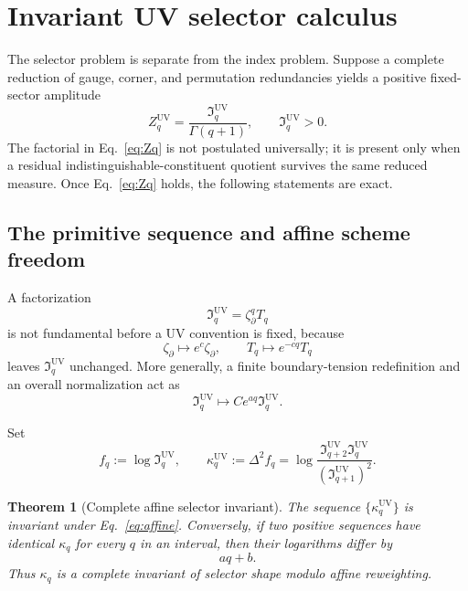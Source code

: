 \documentclass[aps,prd,preprint,nofootinbib,superscriptaddress]{revtex4-2}
\newtheorem{theorem}{Theorem}[section]
\theoremstyle{definition}
\theoremstyle{remark}
\newcommand{\UV}{\mathrm{UV}}
\newcommand{\cI}{\mathfrak I}
\begin{document}
\section{Invariant UV selector calculus}
\label{sec:selector}

The selector problem is separate from the index problem.  Suppose a complete reduction of gauge, corner, and permutation redundancies yields a positive fixed-sector amplitude
\begin{equation}
Z_q^{\UV}
=
\frac{\cI_q^{\UV}}{\Gamma(q+1)},
\qquad
\cI_q^{\UV}>0.
\label{eq:Zq}
\end{equation}
The factorial in Eq.~\eqref{eq:Zq} is not postulated universally; it is present only when a residual indistinguishable-constituent quotient survives the same reduced measure.  Once Eq.~\eqref{eq:Zq} holds, the following statements are exact.

\subsection{The primitive sequence and affine scheme freedom}

A factorization
\begin{equation}
\cI_q^{\UV}=\zeta_\partial^q T_q
\label{eq:factor}
\end{equation}
is not fundamental before a UV convention is fixed, because
\begin{equation}
\zeta_\partial\longmapsto e^c\zeta_\partial,
\qquad
T_q\longmapsto e^{-cq}T_q
\label{eq:splitgauge}
\end{equation}
leaves $\cI_q^{\UV}$ unchanged.  More generally, a finite boundary-tension redefinition and an overall normalization act as
\begin{equation}
\cI_q^{\UV}\longmapsto C e^{a q}\cI_q^{\UV}.
\label{eq:affine}
\end{equation}

Set
\begin{equation}
f_q:=\log\cI_q^{\UV},
\qquad
\kappa_q^{\UV}:=\Delta^2 f_q
=
\log
\frac{\cI_{q+2}^{\UV}\cI_q^{\UV}}
{(\cI_{q+1}^{\UV})^2}.
\label{eq:kappa}
\end{equation}

\begin{theorem}[Complete affine selector invariant]
\label{thm:affine}
The sequence $\{\kappa_q^{\UV}\}$ is invariant under Eq.~\eqref{eq:affine}.  Conversely, if two positive sequences have identical $\kappa_q$ for every $q$ in an interval, then their logarithms differ by
\begin{equation}
a q+b.
\label{eq:affinediff}
\end{equation}
Thus $\kappa_q$ is a complete invariant of selector shape modulo affine reweighting.
\end{theorem}
\end{document}
